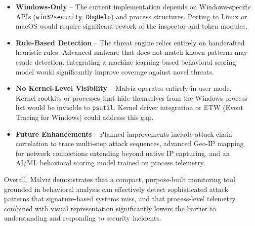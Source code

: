 \begin{itemize}
    \item \textbf{Windows-Only} -- The current implementation depends on Windows-specific APIs (\texttt{win32security}, \texttt{DbgHelp}) and process structures. Porting to Linux or macOS would require significant rework of the inspector and token modules.

    \item \textbf{Rule-Based Detection} -- The threat engine relies entirely on handcrafted heuristic rules. Advanced malware that does not match known patterns may evade detection. Integrating a machine learning-based behavioral scoring model would significantly improve coverage against novel threats.

    \item \textbf{No Kernel-Level Visibility} -- Malviz operates entirely in user mode. Kernel rootkits or processes that hide themselves from the Windows process list would be invisible to \texttt{psutil}. Kernel driver integration or ETW (Event Tracing for Windows) could address this gap.

    \item \textbf{Future Enhancements} -- Planned improvements include attack chain correlation to trace multi-step attack sequences, advanced Geo-IP mapping for network connections extending beyond native IP capturing, and an AI/ML behavioral scoring model trained on process telemetry.
\end{itemize}

Overall, Malviz demonstrates that a compact, purpose-built monitoring tool grounded in behavioral analysis can effectively detect sophisticated attack patterns that signature-based systems miss, and that process-level telemetry combined with visual representation significantly lowers the barrier to understanding and responding to security incidents.
